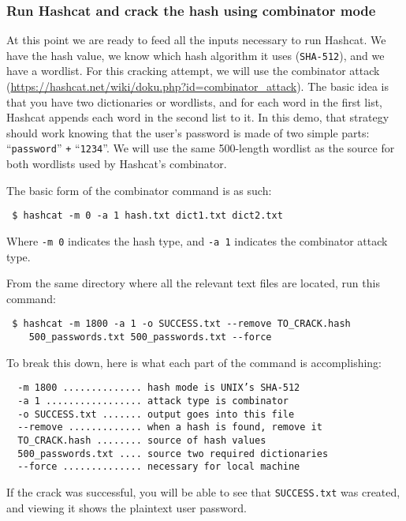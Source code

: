 \subsubsection{Run Hashcat and crack the hash using combinator mode}
  At this point we are ready to feed all the inputs necessary to run Hashcat. We have the hash value, we know which hash algorithm it uses (\verb|SHA-512|), and we have a wordlist. For this cracking attempt, we will use the combinator attack (\url{https://hashcat.net/wiki/doku.php?id=combinator_attack}). The basic idea is that you have two dictionaries or wordlists, and for each word in the first list, Hashcat appends each word in the second list to it. In this demo, that strategy should work knowing that the user’s password is made of two simple parts: ``\verb|password|'' \verb|+| ``\verb|1234|''. We will use the same 500-length wordlist as the source for both wordlists used by Hashcat’s combinator.
  \newline

  \noindent
  The basic form of the combinator command is as such:
  \begin{verbatim} $ hashcat -m 0 -a 1 hash.txt dict1.txt dict2.txt \end{verbatim}
  \noindent
  Where \verb|-m 0| indicates the hash type, and \verb|-a 1| indicates the combinator attack type.
  \newline

  \noindent
  From the same directory where all the relevant text files are located, run this command:
  \begin{verbatim} $ hashcat -m 1800 -a 1 -o SUCCESS.txt --remove TO_CRACK.hash
    500_passwords.txt 500_passwords.txt --force \end{verbatim}

  \noindent
  To break this down, here is what each part of the command is accomplishing:
  \begin{verbatim}
  -m 1800 .............. hash mode is UNIX’s SHA-512
  -a 1 ................. attack type is combinator
  -o SUCCESS.txt ....... output goes into this file
  --remove ............. when a hash is found, remove it
  TO_CRACK.hash ........ source of hash values
  500_passwords.txt .... source two required dictionaries
  --force .............. necessary for local machine
  \end{verbatim}

  \noindent
  If the crack was successful, you will be able to see that \verb|SUCCESS.txt| was created, and viewing it shows the plaintext user password.

